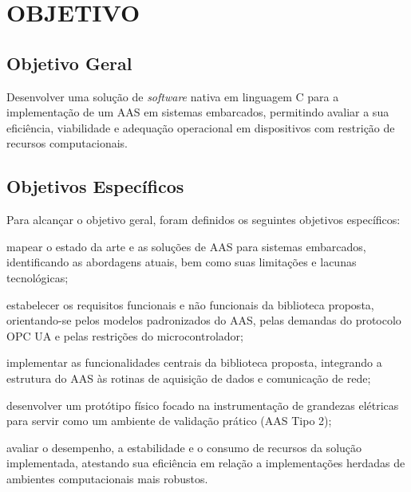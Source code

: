 \chapter{OBJETIVO}

\section{Objetivo Geral}

Desenvolver uma solução de \textit{software} nativa em linguagem C para a implementação de um AAS em sistemas embarcados, permitindo avaliar a sua eficiência, viabilidade e adequação operacional em dispositivos com restrição de recursos computacionais.

\section{Objetivos Específicos}

Para alcançar o objetivo geral, foram definidos os seguintes objetivos específicos:
\begin{alineas}
    \item mapear o estado da arte e as soluções de AAS para sistemas embarcados, identificando as abordagens atuais, bem como suas limitações e lacunas tecnológicas;
    \item estabelecer os requisitos funcionais e não funcionais da biblioteca proposta, orientando-se pelos modelos padronizados do AAS, pelas demandas do protocolo OPC UA e pelas restrições do microcontrolador;
    \item implementar as funcionalidades centrais da biblioteca proposta, integrando a estrutura do AAS às rotinas de aquisição de dados e comunicação de rede;
    \item desenvolver um protótipo físico focado na instrumentação de grandezas elétricas para servir como um ambiente de validação prático (AAS Tipo 2);
    \item avaliar o desempenho, a estabilidade e o consumo de recursos da solução implementada, atestando sua eficiência em relação a implementações herdadas de ambientes computacionais mais robustos.
\end{alineas}
